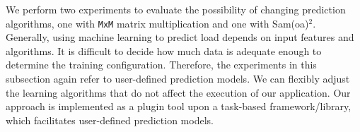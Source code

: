 \begin{table}[t]
\caption{The evaluation of load prediction using different machine learning regression algorithms.}
\centering
{}
\label{tab:loss_regmodels_compare}
\end{table}

We perform two experiments to evaluate the possibility of changing prediction algorithms, one with \texttt{MxM} matrix multiplication and one with Sam(oa)$^2$. Generally, using machine learning to predict load depends on input features and algorithms. It is difficult to decide how much data is adequate enough to determine the training configuration. Therefore, the experiments in this subsection again refer to user-defined prediction models. We can flexibly adjust the learning algorithms that do not affect the execution of our application. Our approach is implemented as a plugin tool upon a task-based framework/library, which facilitates user-defined prediction models.\\

